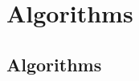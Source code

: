 \documentclass[../discrete.tex]{subfiles}
\begin{document}
\chapter{Algorithms}
\section{Algorithms}
\end{document}

